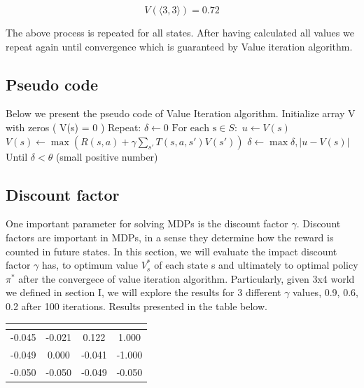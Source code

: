 \documentclass[10pt,a4paper,twocolumn]{article}
\newcommand\tab[1][0.5cm]{\hspace*{#1}}
\begin{document}
	\begin{equation}
	 V(\big \langle 3,3 \big \rangle) = 0.72
	\end{equation}


	The above process is repeated for all states. After having calculated all values we repeat again until convergence which is guaranteed by Value iteration algorithm.
	\subsection{Pseudo code}
	Below we present the pseudo code of Value Iteration algorithm.
	\newline
	\newline
	Initialize array V with zeros ( V(s) = 0 )
	\newline
	Repeat:
	\newline
	\tab $\delta \leftarrow 0$
	\newline
	\tab  $\text{For each s} \in S:$
	\newline
	\tab  \tab  $u \leftarrow V(s)$
	\newline
	\tab  \tab  $V(s) \leftarrow \max{ ( R(s,a) + \gamma \sum_{s'}T(s,a,s')V(s') )}$
	\newline
	\tab  \tab  $\delta \leftarrow \max{\delta, | u - V(s)|}$
	\newline
	Until $\delta < \theta$ (small positive number)
	
	
	\subsection{Discount factor}
	 One  important parameter for solving  MDPs is the discount factor $\gamma$. Discount factors are important in MDPs, in a sense they determine how the reward is counted in future states.
	 In this section, we will evaluate the impact discount factor $\gamma$ has, to optimum value $V_{s}^{*}$ of each state s and ultimately to optimal policy $\pi^{*} $ after the convergece of value iteration algorithm. Particularly, given 3x4 world we defined in section I, we will explore the results for 3 different $\gamma$ values, 0.9, 0.6, 0.2 after 100 iterations. Results presented in the table below.
	 
	 	\begin{center}
	 	\begin{tabular}{ c c c c}
	 		\hline
	 		\multicolumn{4}{|c|}{  \text{$\gamma = 0.2$} } \\
	 		\hline 		
	 		-0.045 & -0.021 & 0.122 & 1.000 \\
	 		-0.049 & 0.000 & -0.041 & -1.000 \\
	 		-0.050 & -0.050 & -0.049 & -0.050 
	 	\end{tabular}
	 \end{center}
	
\end{document}
